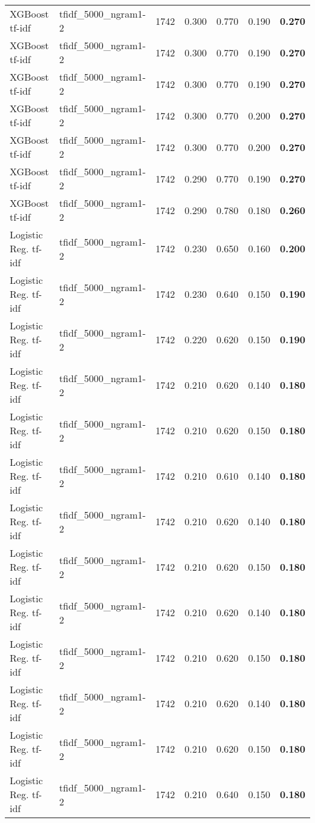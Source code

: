 \begin{table*}[t]
\begin{tabular}{l l r r r r r}
XGBoost tf-idf & tfidf_5000_ngram1-2 & 1742 & 0.300 & 0.770 & 0.190 & \textbf{0.270} \\
XGBoost tf-idf & tfidf_5000_ngram1-2 & 1742 & 0.300 & 0.770 & 0.190 & \textbf{0.270} \\
XGBoost tf-idf & tfidf_5000_ngram1-2 & 1742 & 0.300 & 0.770 & 0.190 & \textbf{0.270} \\
XGBoost tf-idf & tfidf_5000_ngram1-2 & 1742 & 0.300 & 0.770 & 0.200 & \textbf{0.270} \\
XGBoost tf-idf & tfidf_5000_ngram1-2 & 1742 & 0.300 & 0.770 & 0.200 & \textbf{0.270} \\
XGBoost tf-idf & tfidf_5000_ngram1-2 & 1742 & 0.290 & 0.770 & 0.190 & \textbf{0.270} \\
XGBoost tf-idf & tfidf_5000_ngram1-2 & 1742 & 0.290 & 0.780 & 0.180 & \textbf{0.260} \\
Logistic Reg. tf-idf & tfidf_5000_ngram1-2 & 1742 & 0.230 & 0.650 & 0.160 & \textbf{0.200} \\
Logistic Reg. tf-idf & tfidf_5000_ngram1-2 & 1742 & 0.230 & 0.640 & 0.150 & \textbf{0.190} \\
Logistic Reg. tf-idf & tfidf_5000_ngram1-2 & 1742 & 0.220 & 0.620 & 0.150 & \textbf{0.190} \\
Logistic Reg. tf-idf & tfidf_5000_ngram1-2 & 1742 & 0.210 & 0.620 & 0.140 & \textbf{0.180} \\
Logistic Reg. tf-idf & tfidf_5000_ngram1-2 & 1742 & 0.210 & 0.620 & 0.150 & \textbf{0.180} \\
Logistic Reg. tf-idf & tfidf_5000_ngram1-2 & 1742 & 0.210 & 0.610 & 0.140 & \textbf{0.180} \\
Logistic Reg. tf-idf & tfidf_5000_ngram1-2 & 1742 & 0.210 & 0.620 & 0.140 & \textbf{0.180} \\
Logistic Reg. tf-idf & tfidf_5000_ngram1-2 & 1742 & 0.210 & 0.620 & 0.150 & \textbf{0.180} \\
Logistic Reg. tf-idf & tfidf_5000_ngram1-2 & 1742 & 0.210 & 0.620 & 0.140 & \textbf{0.180} \\
Logistic Reg. tf-idf & tfidf_5000_ngram1-2 & 1742 & 0.210 & 0.620 & 0.150 & \textbf{0.180} \\
Logistic Reg. tf-idf & tfidf_5000_ngram1-2 & 1742 & 0.210 & 0.620 & 0.140 & \textbf{0.180} \\
Logistic Reg. tf-idf & tfidf_5000_ngram1-2 & 1742 & 0.210 & 0.620 & 0.150 & \textbf{0.180} \\
Logistic Reg. tf-idf & tfidf_5000_ngram1-2 & 1742 & 0.210 & 0.640 & 0.150 & \textbf{0.180} \\

\end{tabular}
\end{table*}
